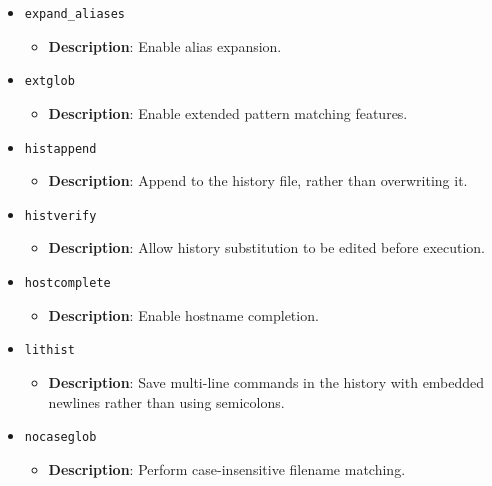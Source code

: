 \documentclass{report}
\begin{document}
\begin{itemize}
        \item \texttt{expand\_aliases}
            \begin{itemize}
                \item \textbf{Description}: Enable alias expansion.
            \end{itemize}

        \item \texttt{extglob}
            \begin{itemize}
                \item \textbf{Description}: Enable extended pattern matching features.
            \end{itemize}

        \item \texttt{histappend}
            \begin{itemize}
                \item \textbf{Description}: Append to the history file, rather than overwriting it.
            \end{itemize}

        \item \texttt{histverify}
            \begin{itemize}
                \item \textbf{Description}: Allow history substitution to be edited before execution.
            \end{itemize}

        \item \texttt{hostcomplete}
            \begin{itemize}
                \item \textbf{Description}: Enable hostname completion.
            \end{itemize}

        \item \texttt{lithist}
            \begin{itemize}
                \item \textbf{Description}: Save multi-line commands in the history with embedded newlines rather than using semicolons.
            \end{itemize}

        \item \texttt{nocaseglob}
            \begin{itemize}
                \item \textbf{Description}: Perform case-insensitive filename matching.
            \end{itemize}


\end{itemize}
\end{document}
